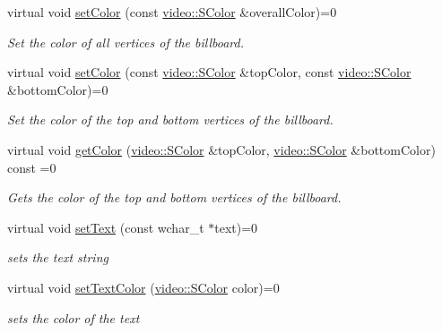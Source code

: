 \begin{DoxyCompactItemize}
virtual void \hyperlink{classirr_1_1scene_1_1IBillboardTextSceneNode_aaa65d10d3a49206728c47b148a64bb4a}{set\+Color} (const \hyperlink{classirr_1_1video_1_1SColor}{video\+::\+S\+Color} \&overall\+Color)=0
\begin{DoxyCompactList}\small\item\em Set the color of all vertices of the billboard. \end{DoxyCompactList}\item 
virtual void \hyperlink{classirr_1_1scene_1_1IBillboardTextSceneNode_ab3faa7c4238acd6bc3a2330cb5650da5}{set\+Color} (const \hyperlink{classirr_1_1video_1_1SColor}{video\+::\+S\+Color} \&top\+Color, const \hyperlink{classirr_1_1video_1_1SColor}{video\+::\+S\+Color} \&bottom\+Color)=0
\begin{DoxyCompactList}\small\item\em Set the color of the top and bottom vertices of the billboard. \end{DoxyCompactList}\item 
virtual void \hyperlink{classirr_1_1scene_1_1IBillboardTextSceneNode_ac142a04e455811d5a3efa47ce2499d18}{get\+Color} (\hyperlink{classirr_1_1video_1_1SColor}{video\+::\+S\+Color} \&top\+Color, \hyperlink{classirr_1_1video_1_1SColor}{video\+::\+S\+Color} \&bottom\+Color) const =0
\begin{DoxyCompactList}\small\item\em Gets the color of the top and bottom vertices of the billboard. \end{DoxyCompactList}\item 
\mbox{\label{classirr_1_1scene_1_1IBillboardTextSceneNode_ab404347cd57f64bb559cca8bed8caa53}} 
virtual void \hyperlink{classirr_1_1scene_1_1IBillboardTextSceneNode_ab404347cd57f64bb559cca8bed8caa53}{set\+Text} (const wchar\+\_\+t $\ast$text)=0
\begin{DoxyCompactList}\small\item\em sets the text string \end{DoxyCompactList}\item 
\mbox{\label{classirr_1_1scene_1_1IBillboardTextSceneNode_a05e1db5ef9af3ff0ab2750ba584583ef}} 
virtual void \hyperlink{classirr_1_1scene_1_1IBillboardTextSceneNode_a05e1db5ef9af3ff0ab2750ba584583ef}{set\+Text\+Color} (\hyperlink{classirr_1_1video_1_1SColor}{video\+::\+S\+Color} color)=0
\begin{DoxyCompactList}\small\item\em sets the color of the text \end{DoxyCompactList}\item 

\end{DoxyCompactItemize}
